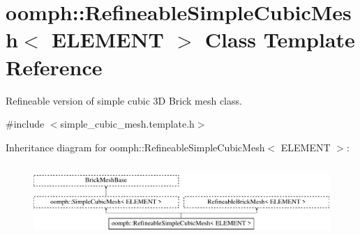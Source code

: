 \hypertarget{classoomph_1_1RefineableSimpleCubicMesh}{}\section{oomph\+:\+:Refineable\+Simple\+Cubic\+Mesh$<$ E\+L\+E\+M\+E\+NT $>$ Class Template Reference}
\label{classoomph_1_1RefineableSimpleCubicMesh}


Refineable version of simple cubic 3D Brick mesh class.  




{\ttfamily \#include $<$simple\+\_\+cubic\+\_\+mesh.\+template.\+h$>$}

Inheritance diagram for oomph\+:\+:Refineable\+Simple\+Cubic\+Mesh$<$ E\+L\+E\+M\+E\+NT $>$\+:\begin{figure}[H]
\begin{center}
\leavevmode
\includegraphics[height=2.745098cm]{classoomph_1_1RefineableSimpleCubicMesh}
\end{center}
\end{figure}
